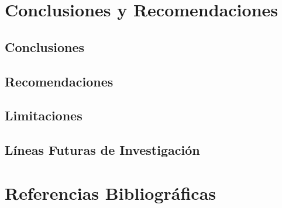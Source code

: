 \documentclass[12pt,a4paper,oneside]{book}
\theoremstyle{plain}
\theoremstyle{definition}
\theoremstyle{remark}
\begin{document}
\chapter{Conclusiones y Recomendaciones}

\section{Conclusiones}
\lipsum[20]

\section{Recomendaciones}
\lipsum[21]

\section{Limitaciones}
\lipsum[22]

\section{Líneas Futuras de Investigación}
\lipsum[23]

\chapter*{Referencias Bibliográficas}
\printbibliography[heading=none]
\end{document}
